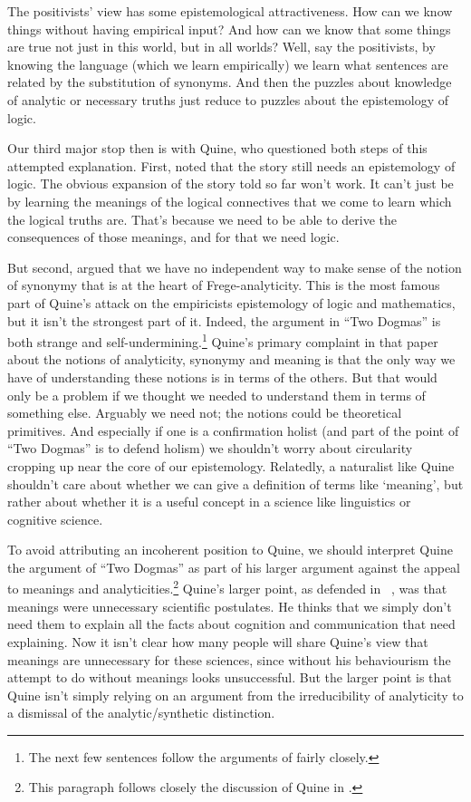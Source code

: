 The positivists' view has some epistemological attractiveness. How can we know things without having empirical input? And how can we know that some things are true not just in this world, but in all worlds? Well, say the positivists, by knowing the language (which we learn empirically) we learn what sentences are related by the substitution of synonyms. And then the puzzles about knowledge of analytic or necessary truths just reduce to puzzles about the epistemology of logic.

Our third major stop then is with Quine, who questioned both steps of this attempted explanation. First,  \citet{QuineTruthConvention} noted that the story still needs an epistemology of logic. The obvious expansion of the story told so far won't work. It can't just be by learning the meanings of the logical connectives that we come to learn which the logical truths are. That's because we need to be able to derive the consequences of those meanings, and for that we need logic.

But second,  \citet{QuineTwoDogmas} argued that we have no independent way to make sense of the notion of synonymy that is at the heart of Frege-analyticity. This is the most famous part of Quine's attack on the empiricists epistemology of logic and mathematics, but it isn't the strongest part of it. Indeed, the argument in ``Two Dogmas'' is both strange and self-undermining.\footnote{The next few sentences follow the arguments of  \citet{Sober2000} fairly closely.} Quine's primary complaint in that paper about the notions of analyticity, synonymy and meaning is that the only way we have of understanding these notions is in terms of the others. But that would only be a problem if we thought we needed to understand them in terms of something else. Arguably we need not; the notions could be theoretical primitives. And especially if one is a confirmation holist (and part of the point of ``Two Dogmas'' is to defend holism) we shouldn't worry about circularity cropping up near the core of our epistemology. Relatedly, a naturalist like Quine shouldn't care about whether we can give a definition of terms like `meaning', but rather about whether it is a useful concept in a science like linguistics or cognitive science.

To avoid attributing an incoherent position to Quine, we should interpret Quine the argument of ``Two Dogmas'' as part of his larger argument against the appeal to meanings and analyticities.\footnote{This paragraph follows closely the discussion of Quine in  \citet{Russell2008}. } Quine's larger point, as defended in ~\citep{Quine1960}, was that meanings were unnecessary scientific postulates. He thinks that we simply don't need them to explain all the facts about cognition and communication that need explaining. Now it isn't clear how many people will share Quine's view that meanings are unnecessary for these sciences, since without his behaviourism the attempt to do without meanings looks unsuccessful. But the larger point is that Quine isn't simply relying on an argument from the irreducibility of analyticity to a dismissal of the analytic\slash synthetic distinction.

